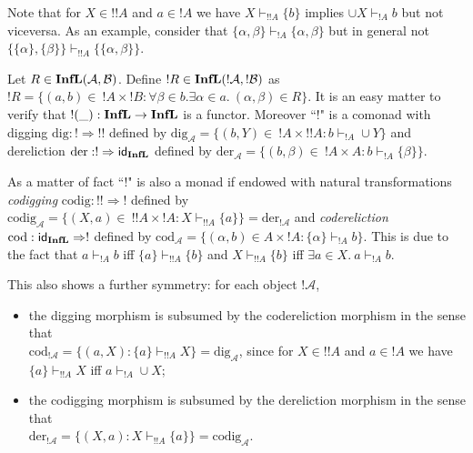 \documentclass[copyright,creativecommons]{eptcs}
\newcommand{\cA}{\mathcal{A}}
\newcommand{\cB}{\mathcal{B}}
\newcommand{\ga}{\alpha}
\newcommand{\gb}{\beta}
\newcommand{\dig}{\mathrm{dig}}
\newcommand{\codig}{\mathrm{codig}}
\newcommand{\der}{\mathrm{der}}
\newcommand{\coder}{\mathrm{cod}}
\begin{document}
Note that for $X \in !!A$ and $a \in !A$ we have $X \vdash_{!!A} \{b\}$ implies $\cup X \vdash_{!A} b$ but not viceversa. As an example, consider that $\{\alpha, \beta\} \vdash_{!A} \{\alpha, \beta\}$ but in general not $\{\{\alpha\}, \{\beta\}\} \vdash_{!!A} \{\{\alpha, \beta\}\}$.

Let $R \in \Infl(\cA, \cB)$. Define $! R \in \Infl(! \cA, ! \cB)$ as \mbox{$! R = \{(a, b) \in \ ! A \times ! B : \forall \gb \in b.\exists \ga \in a.\ (\ga, \gb) \in R\}$.} It is an easy matter to verify that \mbox{$!(\_): \mathbf{InfL} \to \mathbf{InfL}$} is a functor. Moreover ``$!$" is a comonad with digging \mbox{$\dig: ! \Rightarrow ! !$} defined by \mbox{$ \dig_\cA = \{(b, Y) \in \ ! A \times !! A : b \vdash_{!A} \cup Y \}$} and dereliction \mbox{$\der: ! \Rightarrow \textsf{id}_\Infl$} defined by \mbox{$\der_\cA = \{(b, \gb) \in \ !A \times A : b \vdash_{! A} \{\gb\} \}$.}

\medskip

As a matter of fact ``$!$" is also a monad if endowed with natural transformations \emph{codigging} \mbox{$\codig: !! \Rightarrow !$} defined by \mbox{$\codig_\cA = \{(X, a) \in \ !!A \times !A : X \vdash_{!!A} \{a\} \} = \der_{!\cA}$} and \emph{codereliction} \mbox{$\coder: \textsf{id}_\Infl \Rightarrow !$} defined by \mbox{$\coder_\cA = \{(\alpha, b) \in A \times !A : \{\alpha\} \vdash_{!A} b \}$.} This is due to the fact that \mbox{$a \vdash_{!A} b$} iff \mbox{$\{a\} \vdash_{!!A} \{b\}$} and \mbox{$X \vdash_{!!A} \{b\}$} iff \mbox{$\exists a \in X.\ a \vdash_{!A} b$}.

\medskip

This also shows a further symmetry: for each object $!\cA$, 
\begin{itemize}
\item the digging morphism is subsumed by the codereliction morphism in the sense that\\ \mbox{$\coder_{!\cA} = \{(a, X) : \{a\} \vdash_{!!A} X\} = \dig_\cA$}, since for $X \in !!A$ and $a \in !A$ we have \mbox{$\{a\} \vdash_{!!A} X$} iff \mbox{$a \vdash_{!A} \cup X$};
\item the codigging morphism is subsumed by the dereliction morphism in the sense that\\ \mbox{$\der_{!\cA} = \{(X, a) : X \vdash_{!!A} \{a\}\} = \codig_\cA$}.
\end{itemize}

\medskip
\end{document}
